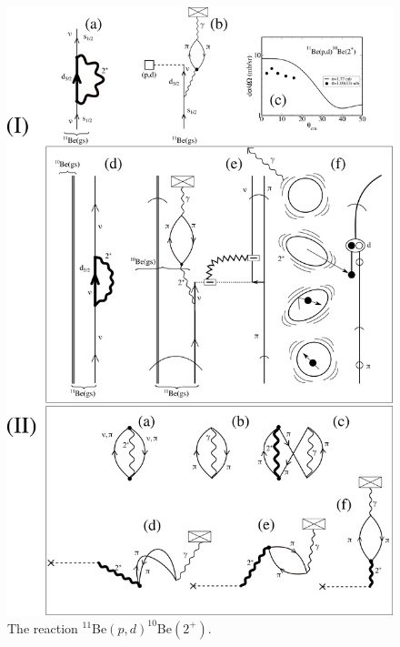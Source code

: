   \begin{figure}
  \centerline{\includegraphics*[width=15cm,angle=0]{C8/figsC8/Fig3}}
  	\caption{The reaction $^{11}$Be$(p,d)^{10}$Be$(2^+)$.}\label{fig6.6.2}
  \end{figure}
  
 
